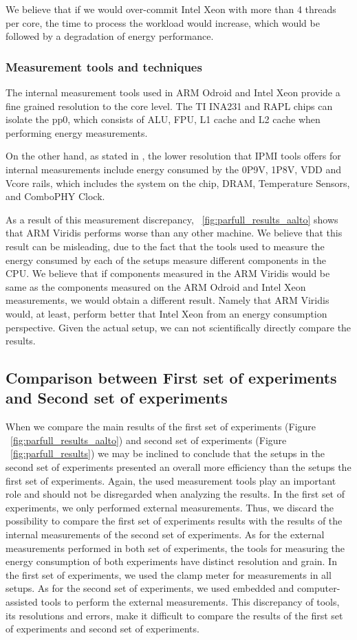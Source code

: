 We believe that if we would over-commit Intel Xeon with more than 4 threads per core, the time to process the workload would increase, which would be followed by a degradation of energy performance.

\subsubsection*{Measurement tools and techniques}

The internal measurement tools used in ARM Odroid and Intel Xeon provide a fine grained resolution to the core level. The TI INA231 and RAPL chips can isolate the pp0, which consists of ALU, FPU, L1 cache and L2 cache when performing energy measurements. 

On the other hand, as stated in \cite{IPMI_resolution}, the lower resolution that IPMI tools offers for internal measurements include energy consumed by the 0P9V, 1P8V, VDD and Vcore rails, which includes the system on the chip, DRAM, Temperature Sensors, and ComboPHY Clock.

As a result of this measurement discrepancy, ~\ref{fig:parfull_results_aalto} shows that ARM Viridis performs worse than any other machine. We believe that this result can be misleading, due to the fact that the tools used to measure the energy consumed by each of the setups measure different components in the CPU. We believe that if components measured in the ARM Viridis would be same as the components measured on the ARM Odroid and Intel Xeon measurements, we would obtain a different result. Namely that ARM Viridis would, at least, perform better that Intel Xeon from an energy consumption perspective. Given the actual setup, we can not scientifically directly compare the results.

\subsection*{Comparison between First set of experiments and Second set of experiments}

When we compare the main results of the first set of experiments (Figure ~\ref{fig:parfull_results_aalto}) and second set of experiments (Figure ~\ref{fig:parfull_results}) we may be inclined to conclude that the setups in the second set of experiments presented an overall more efficiency than the setups the first set of experiments. Again, the used measurement tools play an important role and should not be disregarded when analyzing the results. 
In the first set of experiments, we only performed external measurements. Thus, we discard the possibility to compare the first set of experiments results with the results of the internal measurements of the second set of experiments. 
As for the external measurements performed in both set of experiments, the tools for measuring the energy consumption of both experiments have distinct resolution and grain. In the first set of experiments, we used the clamp meter for measurements in all setups. As for the second set of experiments, we used embedded and computer-assisted tools to perform the external measurements. This discrepancy of tools, its resolutions and errors, make it difficult to compare the results of the first set of experiments and second set of experiments.

